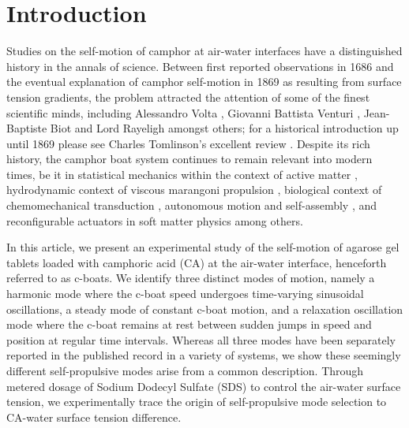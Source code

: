 \documentclass[journal=langd5, manuscript=article, layout=twocolumn]{achemso}
\begin{document}
\section{Introduction}
\label{introsec}
Studies on the self-motion of camphor at air-water interfaces have a distinguished history in the annals of science. Between first reported observations in 1686 \cite{Heyde1686} and the eventual explanation of camphor self-motion in 1869 \cite{Mensbrugghe1869} as resulting from surface tension gradients, the problem attracted the attention of some of the finest scientific minds, including Alessandro Volta \cite{Volta1787}, Giovanni Battista Venturi \cite{Venturi1797}, Jean-Baptiste Biot \cite{Biot1801} and Lord Rayeligh \cite{Rayleigh1889} amongst others; for a historical introduction up until 1869 please see Charles Tomlinson's excellent review \cite{Tomlinson1869}. Despite its rich history, the camphor boat system continues to remain relevant into modern times, be it in statistical mechanics within the context of active matter \cite{Ramaswamy2010}, hydrodynamic context of viscous marangoni propulsion \cite{Lauga2012}, biological context of chemomechanical transduction \cite{Nakata1997}, autonomous motion and self-assembly \cite{Ismagilov2002}, and reconfigurable actuators in soft matter physics \cite{Geryak2014} among others.

In this article, we present an experimental study of the self-motion of agarose gel tablets loaded with camphoric acid (CA) at the air-water interface, henceforth referred to as c-boats. We identify three distinct modes of motion, namely a harmonic mode where the c-boat speed undergoes time-varying sinusoidal oscillations, a steady mode of constant c-boat motion, and a relaxation oscillation mode where the c-boat remains at rest between sudden jumps in speed and position at regular time intervals. Whereas all three modes have been separately reported in the published record \cite{Hayashima2001, Suematsu2010, Jin2012, velev2012} in a variety of systems, we show these seemingly different self-propulsive modes arise from a common description. Through metered dosage of Sodium Dodecyl Sulfate (SDS) to control the air-water surface tension, we experimentally trace the origin of self-propulsive mode selection to CA-water surface tension difference.
\end{document}
